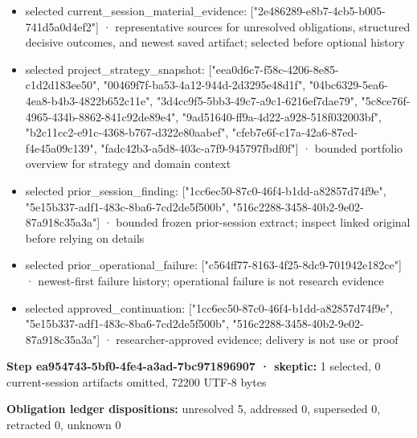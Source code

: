 \documentclass[11pt]{article}
\begin{document}
\begin{itemize}
\item selected current\_session\_material\_evidence: ["2e486289-e8b7-4cb5-b005-741d5a0d4ef2"] · representative sources for unresolved obligations, structured decisive outcomes, and newest saved artifact; selected before optional history
\item selected project\_strategy\_snapshot: ["eea0d6c7-f58c-4206-8e85-c1d2d183ee50", "00469f7f-ba53-4a12-944d-2d3295e48d1f", "04bc6329-5ea6-4ea8-b4b3-4822b652c11e", "3d4cc9f5-5bb3-49c7-a9c1-6216ef7dae79", "5c8ce76f-4965-434b-8862-841c92de89e4", "9ad51640-ff9a-4d22-a928-518f032003bf", "b2c11cc2-e91c-4368-b767-d322e80aabef", "cfeb7e6f-c17a-42a6-87ed-f4e45a09c139", "fadc42b3-a5d8-403c-a7f9-945797fbdf0f"] · bounded portfolio overview for strategy and domain context
\item selected prior\_session\_finding: ["1cc6ec50-87c0-46f4-b1dd-a82857d74f9e", "5e15b337-adf1-483c-8ba6-7cd2de5f500b", "516c2288-3458-40b2-9e02-87a918c35a3a"] · bounded frozen prior-session extract; inspect linked original before relying on details
\item selected prior\_operational\_failure: ["c564ff77-8163-4f25-8dc9-701942e182ce"] · newest-first failure history; operational failure is not research evidence
\item selected approved\_continuation: ["1cc6ec50-87c0-46f4-b1dd-a82857d74f9e", "5e15b337-adf1-483c-8ba6-7cd2de5f500b", "516c2288-3458-40b2-9e02-87a918c35a3a"] · researcher-approved evidence; delivery is not use or proof
\end{itemize}
\textbf{Step ea954743-5bf0-4fe4-a3ad-7bc971896907 · skeptic:} 1 selected, 0 current-session artifacts omitted, 72200 UTF-8 bytes\par
\textbf{Obligation ledger dispositions:} unresolved 5, addressed 0, superseded 0, retracted 0, unknown 0\par
\end{document}
